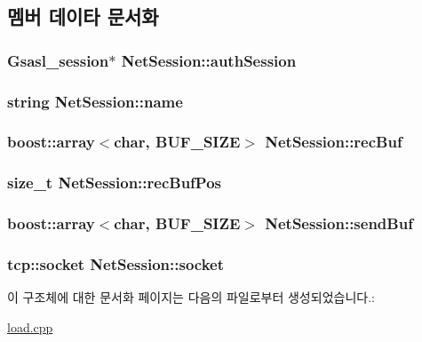 \subsection{멤버 데이타 문서화}
\hypertarget{struct_net_session_a633af90850d032509cfa243abb6898a8}{
\subsubsection[{auth\-Session}]{\setlength{\rightskip}{0pt plus 5cm}Gsasl\-\_\-session$\ast$ Net\-Session\-::auth\-Session}}\label{struct_net_session_a633af90850d032509cfa243abb6898a8}
\hypertarget{struct_net_session_aec0bfb7bd042d9f19df3fc91dd8accae}{
\subsubsection[{name}]{\setlength{\rightskip}{0pt plus 5cm}string Net\-Session\-::name}}\label{struct_net_session_aec0bfb7bd042d9f19df3fc91dd8accae}
\hypertarget{struct_net_session_ae53e0baac8f14adba2d5b7d71c715ce7}{
\subsubsection[{rec\-Buf}]{\setlength{\rightskip}{0pt plus 5cm}boost\-::array$<$char, {\bf B\-U\-F\-\_\-\-S\-I\-Z\-E}$>$ Net\-Session\-::rec\-Buf}}\label{struct_net_session_ae53e0baac8f14adba2d5b7d71c715ce7}
\hypertarget{struct_net_session_abf9c78874e44c3aa6176e288e77f5aae}{
\subsubsection[{rec\-Buf\-Pos}]{\setlength{\rightskip}{0pt plus 5cm}size\-\_\-t Net\-Session\-::rec\-Buf\-Pos}}\label{struct_net_session_abf9c78874e44c3aa6176e288e77f5aae}
\hypertarget{struct_net_session_a6e3c17623ebe78851968a210e95fcc38}{
\subsubsection[{send\-Buf}]{\setlength{\rightskip}{0pt plus 5cm}boost\-::array$<$char, {\bf B\-U\-F\-\_\-\-S\-I\-Z\-E}$>$ Net\-Session\-::send\-Buf}}\label{struct_net_session_a6e3c17623ebe78851968a210e95fcc38}
\hypertarget{struct_net_session_a93ead5e6efef575fd61ed0514100310b}{
\subsubsection[{socket}]{\setlength{\rightskip}{0pt plus 5cm}tcp\-::socket Net\-Session\-::socket}}\label{struct_net_session_a93ead5e6efef575fd61ed0514100310b}


이 구조체에 대한 문서화 페이지는 다음의 파일로부터 생성되었습니다.\-:\begin{DoxyCompactItemize}
\item 
\hyperlink{load_8cpp}{load.\-cpp}\end{DoxyCompactItemize}
